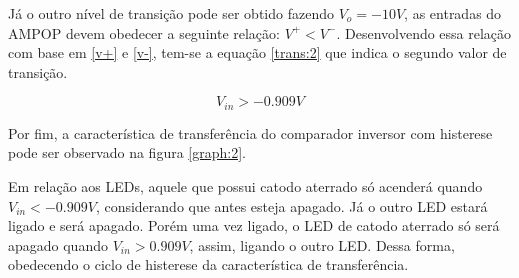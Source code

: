 Já o outro nível de transição pode ser obtido fazendo $V_o=-10V$, as entradas do AMPOP devem obedecer a seguinte relação: $V^+<V^-$. Desenvolvendo essa relação com base em \ref{v+} e \ref{v-}, tem-se a equação \ref{trans:2} que indica o segundo valor de transição.

\begin{center}
\begin{equation} \label{trans:1}
       V_{in}>-0.909 V
\end{equation}
\end{center}

Por fim, a característica de transferência do comparador inversor com histerese pode ser observado na figura \ref{graph:2}. 



Em relação aos LEDs, aquele que possui catodo aterrado só acenderá quando $V_{in}<-0.909V$, considerando que antes esteja apagado. Já o outro LED estará ligado e será apagado. Porém uma vez ligado, o LED de catodo aterrado só será apagado quando $V_{in}>0.909V$, assim, ligando o outro LED. Dessa forma, obedecendo o ciclo de histerese da característica de transferência.

